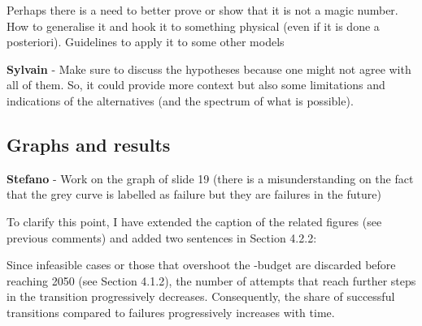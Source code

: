 \documentclass[12pt,a4paper]{article}
\begin{document}
\noindent Perhaps there is a need to better prove or show that it is not a magic number.  How to generalise it and hook it to something physical (even if it is done a posteriori). Guidelines to apply it to some other models

\begin{mdframed}[style=manuscript] %

\end{mdframed}

\begin{mdframed}[style=comment] %
{\color{purple} \textbf{Sylvain}} - Make sure to discuss the hypotheses because one might not agree with all of them. So, it could provide more context but also some limitations and indications of the alternatives (and the spectrum of what is possible).
\end{mdframed}

\noindent

\begin{mdframed}[style=manuscript] %

\end{mdframed}



\subsection{Graphs and results}
\label{general_graphs_results}

\begin{mdframed}[style=comment] %
{\color{orange} \textbf{Stefano}} - Work on the graph of slide 19 (there is a misunderstanding on the fact that the grey curve is labelled as failure but they are failures in the future)
\end{mdframed}

\noindent To clarify this point, I have extended the caption of the related figures (see previous comments) and added two sentences in {\color{blue} Section 4.2.2}:

\begin{mdframed}[style=manuscript] %
Since infeasible cases or those that overshoot the -budget are discarded before reaching 2050 (see Section 4.1.2), the number of attempts that reach further steps in the transition progressively decreases. Consequently, the share of successful transitions compared to failures progressively increases with time. 
\end{mdframed}
\end{document}
